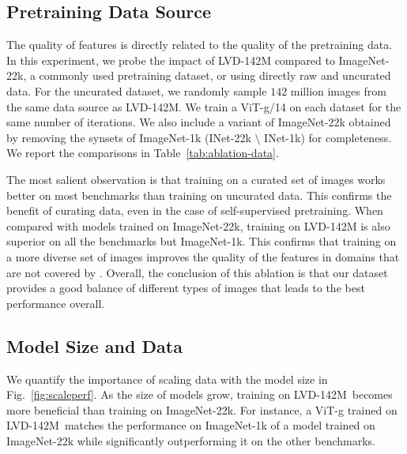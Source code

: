 \subsection{Pretraining Data Source} The quality of features is directly related to the quality of the pretraining data. In this experiment, we probe the impact of LVD-142M compared to ImageNet-22k, a commonly used pretraining dataset, or using directly raw and uncurated data. For the uncurated dataset, we randomly sample $142$ million images from the same data source as LVD-142M. We train a ViT-g/14 on each dataset for the same number of iterations. We also include a variant of ImageNet-22k obtained by removing the synsets of ImageNet-1k (INet-22k $\setminus$ INet-1k) for completeness. We report the comparisons in Table~\ref{tab:ablation-data}.

The most salient observation is that training on a curated set of images works better on most benchmarks than training on uncurated data. This confirms the benefit of curating data, even in the case of self-supervised pretraining. When compared with models trained on ImageNet-22k, training on LVD-142M is also superior on all the benchmarks but ImageNet-1k. This confirms that training on a more diverse set of images improves the quality of the features in domains that are not covered by .
 Overall, the conclusion of this ablation is that our dataset provides a good balance of different types of images that leads to the best performance overall.

\subsection{Model Size and Data} We quantify the importance of scaling data with the model size in Fig.~\ref{fig:scaleperf}.
As the size of models grow, training on LVD-142M\ becomes more beneficial than training on ImageNet-22k. For instance, a ViT-g trained on LVD-142M\ matches the performance on ImageNet-1k of a model trained on ImageNet-22k while significantly outperforming it on the other benchmarks.  

